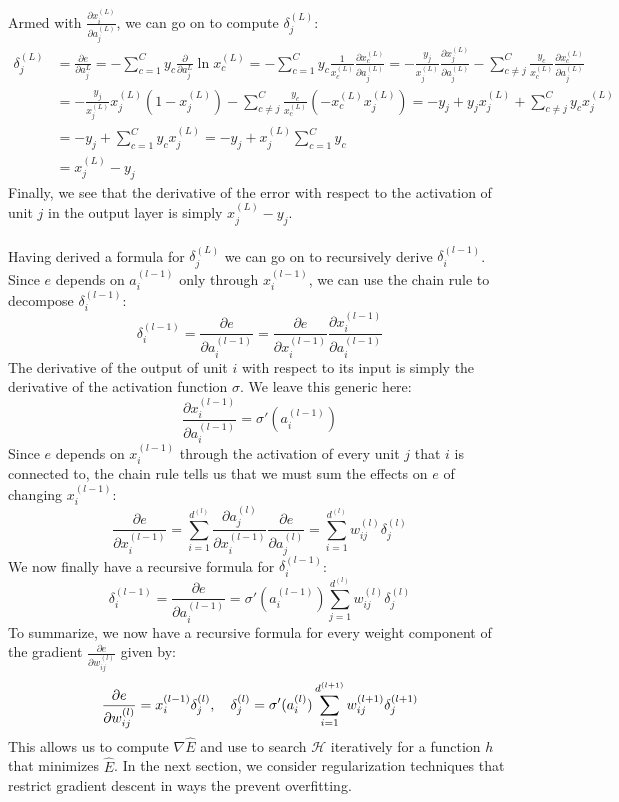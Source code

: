 Armed with $\frac{\partial x^{(L)}_i}{\partial a^{(L)}_j}$, we can go on to compute $\delta^{(L)}_j$:
\begin{align*}
	\delta^{(L)}_j 
	&= \frac{\partial e}{\partial a^{L}_j}
	= - \sum\limits_{c=1}^C y_c \frac{\partial}{\partial a^{L}_j}\ln x^{(L)}_c
	=  - \sum\limits_{c=1}^C y_c \frac{1}{x^{(L)}_c}\frac{\partial x^{(L)}_c}{\partial a^{(L)}_j}
	= - \frac{y_j}{x^{(L)}_j} \frac{\partial x^{(L)}_j}{\partial a^{(L)}_j} - \sum\limits_{c \neq j}^C \frac{y_c}{x^{(L)}_c} \frac{\partial x^{(L)}_c}{\partial a^{(L)}_j}\\
	&= - \frac{y_j}{x^{(L)}_j} x^{(L)}_j(1 - x^{(L)}_j)  - \sum\limits_{c \neq j}^C \frac{y_c}{x^{(L)}_c} (-x^{(L)}_c x^{(L)}_j)
	= - y_j + y_j x^{(L)}_j + \sum\limits_{c \neq j}^C y_c x^{(L)}_j\\
	&= - y_j + \sum\limits_{c = 1}^C y_c x^{(L)}_j
	= - y_j + x^{(L)}_j \sum\limits_{c = 1}^C y_c\\
	&=  x^{(L)}_j - y_j
\end{align*}
Finally, we see that the derivative of the error with respect to the activation of unit $j$ in the output layer is simply $x^{(L)}_j - y_j$.
\\\\
Having derived a formula for $\delta^{(L)}_j$ we can go on to recursively derive $\delta^{(l-1)}_i$. Since $e$ depends on $a^{(l-1)}_i$ only through $x^{(l-1)}_i$, we can use the chain rule to decompose $\delta^{(l-1)}_i$:
$$
\delta^{(l-1)}_i = \frac{\partial e}{\partial a^{(l-1)}_i} = \frac{\partial e}{\partial x^{(l-1)}_i} \frac{\partial x^{(l-1)}_i}{\partial a^{(l-1)}_i}
$$
The derivative of the output of unit $i$ with respect to its input is simply the derivative of the activation function $\sigma$. We leave this generic here:
$$
\frac{\partial x^{(l-1)}_i}{\partial a^{(l-1)}_i} = \sigma'(a^{(l-1)}_i)
$$
Since $e$ depends on $x^{(l-1)}_i$ through the activation of every unit $j$ that $i$ is connected to, the chain rule tells us that we must sum the effects on $e$ of changing $x^{(l-1)}_i$:
$$
\frac{\partial e}{\partial x^{(l-1)}_i} 
= \sum\limits_{i=1}^{d^{(l)}} \frac{\partial a^{(l)}_j}{\partial x^{(l-1)}_i} \frac{\partial e}{\partial a^{(l)}_j}
= \sum\limits_{i=1}^{d^{(l)}} w^{(l)}_{ij} \delta^{(l)}_j
$$
We now finally have a recursive formula for $\delta^{(l-1)}_i$:
$$
\delta^{(l-1)}_i = \frac{\partial e}{\partial a^{(l-1)}_i}
= \sigma'(a^{(l-1)}_i) \sum\limits_{j=1}^{d^{(l)}} w^{(l)}_{ij} \delta^{(l)}_j
$$
To summarize, we now have a recursive formula for every weight component of the gradient $\frac{\partial e}{\partial w^{(l)}_{ij}}$ given by:
$$
\frac{\partial e}{\partial w^{(l)}_{ij}} = x^{(l-1)}_i \delta^{(l)}_j,\quad \delta^{(l)}_j = \sigma'(a^{(l)}_i) \sum\limits_{i=1}^{d^{(l+1)}} w^{(l+1)}_{ij} \delta^{(l+1)}_j
$$
This allows us to compute $\nabla\hat{E}$ and use to search $\mathcal{H}$ iteratively for a function $h$ that minimizes $\hat{E}$. In the next section, we consider regularization techniques that restrict gradient descent in ways the prevent overfitting.

